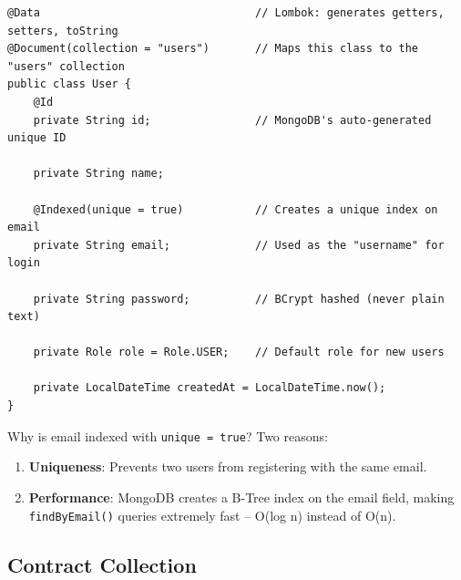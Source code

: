 \documentclass[11pt, a4paper]{article}
\begin{document}
\begin{lstlisting}[caption={User.java -- The MongoDB Document Model}]
@Data                                 // Lombok: generates getters, setters, toString
@Document(collection = "users")       // Maps this class to the "users" collection
public class User {
    @Id
    private String id;                // MongoDB's auto-generated unique ID

    private String name;

    @Indexed(unique = true)           // Creates a unique index on email
    private String email;             // Used as the "username" for login

    private String password;          // BCrypt hashed (never plain text)

    private Role role = Role.USER;    // Default role for new users

    private LocalDateTime createdAt = LocalDateTime.now();
}
\end{lstlisting}

\begin{interviewbox}{Why is email indexed with \texttt{unique = true}?}
Two reasons:
\begin{enumerate}
    \item \textbf{Uniqueness}: Prevents two users from registering with the same email.
    \item \textbf{Performance}: MongoDB creates a B-Tree index on the email field, making \texttt{findByEmail()} queries extremely fast -- O(log n) instead of O(n).
\end{enumerate}
\end{interviewbox}

\subsection{Contract Collection}
\end{document}
